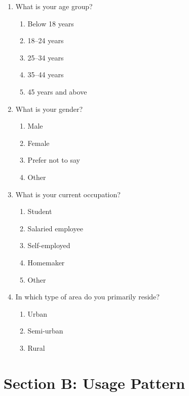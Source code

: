 \begin{enumerate}[label=\textbf{Q\arabic*.}]
    \item What is your age group?
    \begin{enumerate}[label=\alph*.]
        \item Below 18 years
        \item 18--24 years
        \item 25--34 years
        \item 35--44 years
        \item 45 years and above
    \end{enumerate}

    \item What is your gender?
    \begin{enumerate}[label=\alph*.]
        \item Male
        \item Female
        \item Prefer not to say
        \item Other
    \end{enumerate}

    \item What is your current occupation?
    \begin{enumerate}[label=\alph*.]
        \item Student
        \item Salaried employee
        \item Self-employed
        \item Homemaker
        \item Other
    \end{enumerate}

    \item In which type of area do you primarily reside?
    \begin{enumerate}[label=\alph*.]
        \item Urban
        \item Semi-urban
        \item Rural
    \end{enumerate}
\end{enumerate}

\section*{Section B: Usage Pattern}

